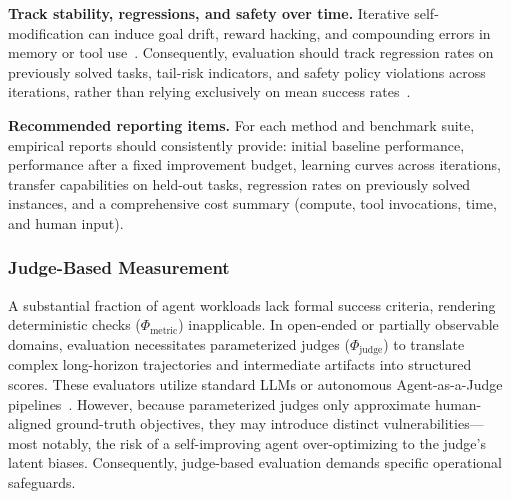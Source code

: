 \textbf{Track stability, regressions, and safety over time.}
Iterative self-modification can induce goal drift, reward hacking, and compounding errors in memory or tool use~\citep{amodei2016concreteproblemsaisafety, bai2022constitutional, ruan2024identifyingriskslmagents, yang2025drunkagentstealthymemorycorruption}. Consequently, evaluation should track regression rates on previously solved tasks, tail-risk indicators, and safety policy violations across iterations, rather than relying exclusively on mean success rates~\citep{levy2025stwebagentbenchbenchmarkevaluatingsafety, yin2025safeagentbenchbenchmarksafetask}.



\textbf{Recommended reporting items.}
For each method and benchmark suite, empirical reports should consistently provide: initial baseline performance, performance after a fixed improvement budget, learning curves across iterations, transfer capabilities on held-out tasks, regression rates on previously solved instances, and a comprehensive cost summary (compute, tool invocations, time, and human input).

\subsubsection{Judge-Based Measurement}
\label{sec:Judge_based_measurement}
A substantial fraction of agent workloads lack formal success criteria, rendering deterministic checks ($\Phi_{\text{metric}}$) inapplicable. In open-ended or partially observable domains, evaluation necessitates parameterized judges ($\Phi_{\text{judge}}$) to translate complex long-horizon trajectories and intermediate artifacts into structured scores. These evaluators utilize standard LLMs or autonomous Agent-as-a-Judge pipelines~\citep{zhuge2024agentasajudgeevaluateagentsagents, you2026agentasajudge, zhang-etal-2025-evaluation, wadhwa2025evalagentdiscoveringimplicitevaluation, xu-etal-2025-learning, han2025verifiagentunifiedverificationagent}. However, because parameterized judges only approximate human-aligned ground-truth objectives, they may introduce distinct vulnerabilities—most notably, the risk of a self-improving agent over-optimizing to the judge's latent biases. Consequently, judge-based evaluation demands specific operational safeguards.


